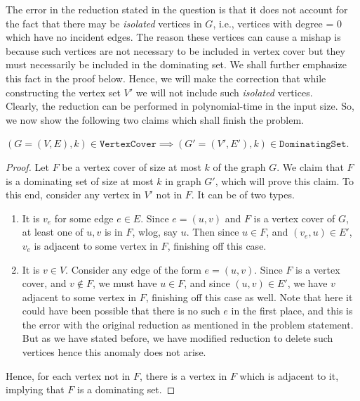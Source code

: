 \begin{soln}
    The error in the reduction stated in the question is that it does not account for the fact that there may be \emph{isolated} vertices in $G$, i.e., vertices with degree = 0 which have no incident edges.
    The reason these vertices can cause a mishap is because such vertices are not necessary to be included in vertex cover but they must necessarily be included in the dominating set. We shall further emphasize this fact in the proof below.
    Hence, we will make the correction that while constructing the vertex set $V'$ we will not include such \emph{isolated} vertices.\\
    Clearly, the reduction can be performed in polynomial-time in the input size. So, we now show the following two claims which shall finish the problem.\nl
    \begin{claim}
        $(G = (V, E), k) \in \texttt{VertexCover} \implies (G' = (V', E'), k) \in \texttt{DominatingSet}$.
    \end{claim}
    \begin{proof}
        Let $F$ be a vertex cover of size at most $k$ of the graph $G$. We claim that $F$ is a dominating set of size at most $k$ in graph $G'$, which will prove this claim.\nl
        To this end, consider any vertex in $V'$ not in $F$. It can be of two types.
        \begin{enumerate}
            \item It is $v_e$ for some edge $e \in E$. Since $e = (u, v)$ and $F$ is a vertex cover of $G$, at least one of $u, v$ is in $F$, wlog, say $u$. Then since $u \in F$, and $(v_e, u) \in
                E'$, $v_e$ is adjacent to some vertex in $F$, finishing off this case.
            \item It is $v \in V$. Consider any edge of the form $e = (u, v)$. Since $F$ is a vertex cover, and $v \not\in F$, we must have $u \in F$, and since $(u, v) \in E'$, we have $v$ adjacent
                to some vertex in $F$, finishing off this case as well.
                Note that here it could have been possible that there is no such $e$ in the first place, and this is the error with the original reduction as mentioned in the problem statement. But as we have stated before, we have modified reduction to delete such vertices hence this anomaly does not arise.
        \end{enumerate}
        Hence, for each vertex not in $F$, there is a vertex in $F$ which is adjacent to it, implying that $F$ is a dominating set.
    \end{proof}

\end{soln}
